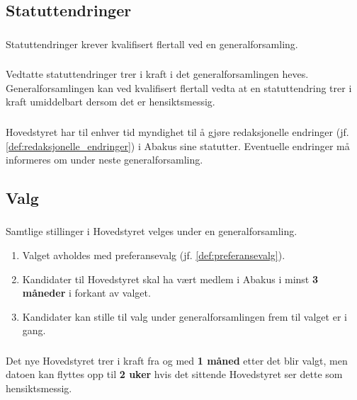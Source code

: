 \subsection{Statuttendringer}
\subsubsection{}
Statuttendringer krever kvalifisert flertall ved en generalforsamling.

\subsubsection{}
Vedtatte statuttendringer trer i kraft i det generalforsamlingen heves. Generalforsamlingen kan ved kvalifisert 
flertall vedta at en statuttendring trer i kraft umiddelbart dersom det er hensiktsmessig.

\subsubsection{}
Hovedstyret har til enhver tid myndighet til å gjøre redaksjonelle endringer (jf. \ref{def:redaksjonelle_endringer}) i
 Abakus sine statutter. Eventuelle endringer må informeres om under neste generalforsamling.

\subsection{Valg}
\subsubsection{}\label{subsec:genfors_valg}
Samtlige stillinger i Hovedstyret velges under en generalforsamling.
\begin{enumerate}[label=\alph*)]
    \item Valget avholdes med preferansevalg (jf. \ref{def:preferansevalg}). 
    \item Kandidater til Hovedstyret skal ha vært medlem i Abakus i minst \textbf{3 måneder} i forkant av valget. 
    \item Kandidater kan stille til valg under generalforsamlingen frem til valget er i gang. 
\end{enumerate}

\subsubsection{}
Det nye Hovedstyret trer i kraft fra og med \textbf{1 måned} etter det blir valgt, men datoen kan 
flyttes opp til \textbf{2 uker} hvis det sittende Hovedstyret ser dette som hensiktsmessig.

